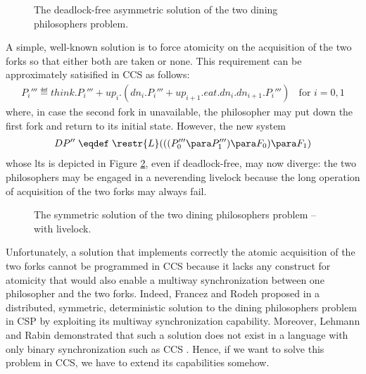 \begin{figure}[t]
\centering

\caption{The deadlock-free asymmetric solution of the two dining philosophers problem.}
\label{dp-asym-lts}
\end{figure}

A simple, well-known solution is to force atomicity on the acquisition of the two forks so that either both are taken or none. 
This requirement can be approximately satisified in CCS as follows:
\begin{eqnarray*}
P_i''' \eqdef think.P_i''' +  up_i.(dn_i.P_i''' + up_{i+1}.eat.dn_i.dn_{i+1}.P_i''')  \; \;  \mbox{   for  }i = 0, 1 
\end{eqnarray*}
where, in case the second fork in unavailable, the philosopher may put down the first fork and return to its initial state. 
However, the new system
\begin{eqnarray*}
DP'' \;  \eqdef \;  \restr{L}(((P_0'''\para P_1''') \para F_0) \para F_1) 
\end{eqnarray*}
whose lts is depicted in Figure \ref{dp-live-lts-tex}, even if deadlock-free, may now diverge:
the two philosophers
may be engaged in a neverending livelock because the long operation of acquisition of the two forks may always fail.

\begin{figure}[t]
\centering

\caption{The symmetric solution of the two dining philosophers problem -- with livelock.}
\label{dp-live-lts-tex}
\end{figure}

Unfortunately, a solution that implements correctly the atomic acquisition of the two forks
cannot be programmed in CCS because it lacks any construct for atomicity that would also
enable a multiway synchronization between one philosopher and the two forks. 
Indeed, Francez and Rodeh proposed in \cite{FR80} a distributed, symmetric, deterministic solution to the dining philosophers problem in 
CSP \cite{Hoa85} by exploiting its  multiway synchronization capability. Moreover, Lehmann and Rabin demonstrated that such a solution 
does not exist in a language with only binary synchronization such as CCS \cite{LR81}. Hence, if we want to solve this problem
in CCS, we have to extend its capabilities somehow.


